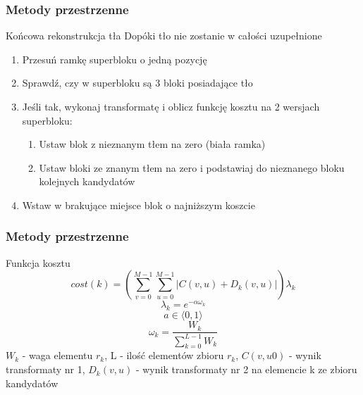 \documentclass{beamer}
\begin{document}
\begin{frame}
\frametitle{Metody przestrzenne}
\begin{block}{Końcowa rekonstrukcja tła}
Dopóki tło nie zostanie w całości uzupełnione
\begin{enumerate}
\item Przesuń ramkę superbloku o jedną pozycję 
\item Sprawdź, czy w superbloku są 3 bloki posiadające tło
\item Jeśli tak, wykonaj transformatę i oblicz funkcję kosztu na 2 wersjach superbloku:
	\begin{enumerate}
	\item Ustaw blok z nieznanym tłem na zero (biała ramka)
	\item Ustaw bloki ze znanym tłem na zero i podstawiaj do nieznanego bloku kolejnych kandydatów
	\end{enumerate}
\item Wstaw w brakujące miejsce blok o najniższym koszcie

\end{enumerate}

\end{block}


\end{frame}
\begin{frame}
\frametitle{Metody przestrzenne}
\begin{block}{Funkcja kosztu}
  \begin{equation}
  \label{costfun}
  cost(k)=\left(\sum_{v=0}^{M-1}\sum_{u=0}^{M-1}\left|C(v,u)+D_k(v,u)\right|\right)\lambda_k
  \end{equation}
  \begin{equation}
  \lambda_k=e^{-\alpha\omega_k}
  \end{equation}
   \begin{equation}
  a\in\langle0,1\rangle
   \end{equation} 
   \begin{equation}
  \omega_k=\frac{W_k}{\sum_{k=0}^{L-1}W_k}
   \end{equation} 
   $W_k$ - waga elementu $r_k$,
   L  - ilość elementów zbioru $r_k$, $C(v,u0)$ - wynik transformaty nr 1, $D_k(v,u)$ - wynik transformaty nr 2 na elemencie k ze zbioru kandydatów
\end{block}


\end{frame}
\end{document}
